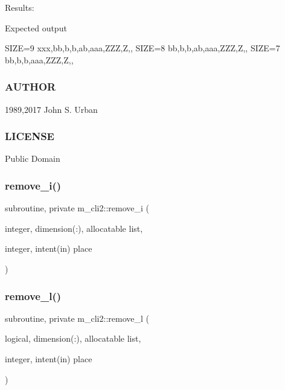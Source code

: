 Results\+:

Expected output

S\+I\+ZE=9 xxx,bb,b,b,ab,aaa,Z\+ZZ,Z,, S\+I\+ZE=8 bb,b,b,ab,aaa,Z\+ZZ,Z,, S\+I\+ZE=7 bb,b,b,aaa,Z\+ZZ,Z,,

\subsubsection*{A\+U\+T\+H\+OR}

1989,2017 John S. Urban \subsubsection*{L\+I\+C\+E\+N\+SE}

Public Domain \mbox{\label{namespacem__cli2_a1c2bd26b3c04a499cc65b00133dfe6b9}} 
\subsubsection{\texorpdfstring{remove\+\_\+i()}{remove\_i()}}
{\footnotesize\ttfamily subroutine, private m\+\_\+cli2\+::remove\+\_\+i (\begin{DoxyParamCaption}\item[{integer, dimension(\+:), allocatable}]{list,  }\item[{integer, intent(in)}]{place }\end{DoxyParamCaption})\hspace{0.3cm}{\ttfamily [private]}}

\mbox{\label{namespacem__cli2_ae3fc38d25a8a4892bde95a7198c2495a}} 
\subsubsection{\texorpdfstring{remove\+\_\+l()}{remove\_l()}}
{\footnotesize\ttfamily subroutine, private m\+\_\+cli2\+::remove\+\_\+l (\begin{DoxyParamCaption}\item[{logical, dimension(\+:), allocatable}]{list,  }\item[{integer, intent(in)}]{place }\end{DoxyParamCaption})\hspace{0.3cm}{\ttfamily [private]}}

